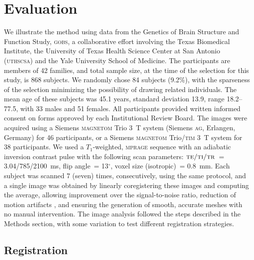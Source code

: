 \section{Evaluation}

We illustrate the method using data from the Genetics of Brain Structure and Function Study, \textsc{gobs}, a collaborative effort involving the Texas Biomedical Institute, the University of Texas Health Science Center at San Antonio (\textsc{uthscsa}) and the Yale University School of Medicine. The participants are members of 42 families, and total sample size, at the time of the selection for this study, is 868 subjects. We randomly chose 84 subjects (9.2\%), with the sparseness of the selection minimizing the possibility of drawing related individuals. The mean age of these subjects was 45.1 years, standard deviation 13.9, range 18.2--77.5, with 33 males and 51 females. All participants provided written informed consent on forms approved by each Institutional Review Board. The images were acquired using a Siemens \textsc{magnetom} Trio 3~T system (Siemens \textsc{ag}, Erlangen, Germany) for 46 participants, or a Siemens \textsc{magnetom} Trio/\textsc{tim} 3~T system for 38 participants. We used a $T_1$-weighted, \textsc{mprage} sequence with an adiabatic inversion contrast pulse with the following scan parameters: $\textsc{te}/\textsc{ti}/\textsc{tr}$~= 3.04/785/2100~ms, flip angle~= 13$^{\circ}$, voxel size (isotropic)~= 0.8~mm. Each subject was scanned 7 (seven) times, consecutively, using the same protocol, and a single image was obtained by linearly coregistering these images and computing the average, allowing improvement over the signal-to-noise ratio, reduction of motion artifacts \citep{Kochunov2006}, and ensuring the generation of smooth, accurate meshes with no manual intervention. The image analysis followed the steps described in the Methods section, with some variation to test different registration strategies.

\subsection{Registration}

